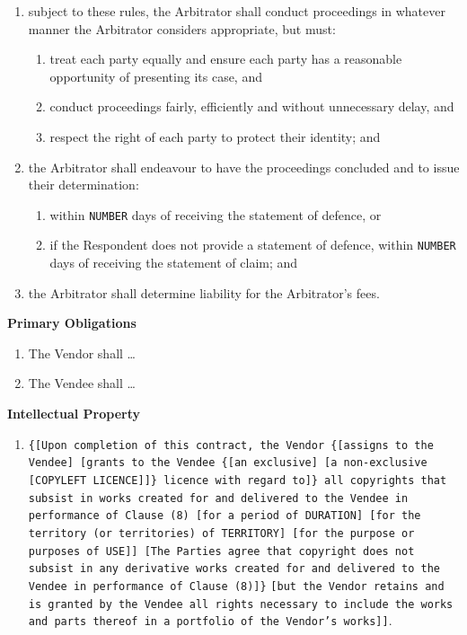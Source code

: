 \documentclass[a4paper,12pt]{article}
\begin{document}
\begin{enumerate}[resume]
\begin{enumerate}
		\item subject to these rules, the Arbitrator shall conduct proceedings in whatever manner the Arbitrator considers appropriate, but must:
		\begin{enumerate}
			\item treat each party equally and ensure each party has a reasonable opportunity of presenting its case, and
			\item conduct proceedings fairly, efficiently and without unnecessary delay, and
			\item respect the right of each party to protect their identity; and
		\end{enumerate}
		\item the Arbitrator shall endeavour to have the proceedings concluded and to issue their determination:
		\begin{enumerate}
			\item within \texttt{\colorbox{branding}{NUMBER}} days of receiving the statement of defence, or
			\item if the Respondent does not provide a statement of defence, within \texttt{\colorbox{branding}{NUMBER}} days of receiving the statement of claim; and
		\end{enumerate}
		\item the Arbitrator shall determine liability for the Arbitrator's fees.
	\end{enumerate}
\end{enumerate}

\textbf{Primary Obligations}

\begin{enumerate}[resume]
	\item The Vendor shall \ldots{}
	\item The Vendee shall \ldots{}
\end{enumerate}

\textbf{Intellectual Property}

\begin{enumerate}[resume]
	\item \texttt{\{[Upon completion of this contract, the Vendor \{[assigns to the Vendee] [grants to the Vendee \{[an exclusive] [a non-exclusive} \texttt{[\colorbox{branding}{COPYLEFT LICENCE}]]\} licence with regard to]\} all copyrights that subsist in works created for and delivered to the Vendee in performance of Clause (8) [for a period of \colorbox{branding}{DURATION}] [for the territory (or territories) of \colorbox{branding}{TERRITORY}] [for the purpose or purposes of \colorbox{branding}{USE}]] [The Parties agree that copyright does not subsist in any derivative works created for and delivered to the Vendee in performance of Clause (8)]\}} \texttt{[but the Vendor retains and is granted by the Vendee all rights necessary to include the works and parts thereof in a portfolio of the Vendor's works]]}.
\end{enumerate}
\end{document}
